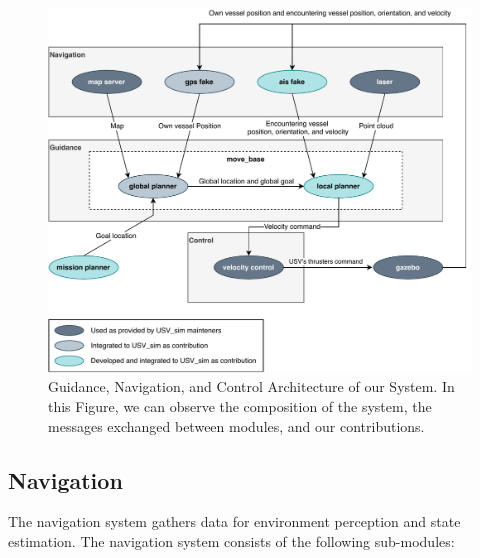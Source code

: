     \begin{figure}
        \centering
        \includegraphics[scale=0.9]{figs/Chap4/gnc_arch.pdf}
        \caption{Guidance, Navigation, and Control Architecture of our System. In this Figure, we can observe the composition of the system, the messages exchanged between modules, and our contributions.}
        \label{fig:gnc_arch}
    \end{figure}
    
        \subsection{Navigation}
    \label{sec:chap4_navigation}
    The navigation system gathers data for environment perception and state estimation. The navigation system consists of the following sub-modules:
    
